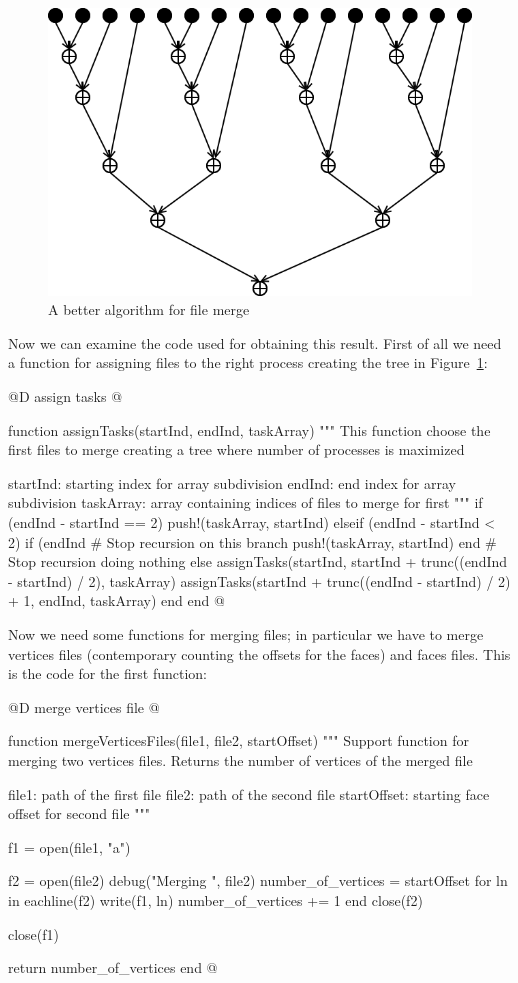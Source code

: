 \documentclass[11pt,oneside]{article}	%
\begin{document}
\begin{figure}[htb] %
   \centering
   \includegraphics[width=0.40\linewidth]{images/ParallelAlgorithm.png}
   \caption{A better algorithm for file merge}
   \label{fig:ParallelAlgorithm}
\end{figure}

Now we can examine the code used for obtaining this result. First of all we need a function for assigning files to the right process creating the tree in Figure~\ref{fig:ParallelAlgorithm}:

@D assign tasks
@{function assignTasks(startInd, endInd, taskArray)
  """
  This function choose the first files to merge
  creating a tree where number of processes is maximized

  startInd: starting index for array subdivision
  endInd: end index for array subdivision
  taskArray: array containing indices of files to merge for first
  """
  if (endInd - startInd == 2)
    push!(taskArray, startInd)
  elseif (endInd - startInd < 2)
    if (endInd %
      # Stop recursion on this branch
      push!(taskArray, startInd)
    end
    # Stop recursion doing nothing
  else
    assignTasks(startInd, startInd + trunc((endInd - startInd) / 2), taskArray)
    assignTasks(startInd + trunc((endInd - startInd) / 2) + 1, endInd, taskArray)
  end
end @}

Now we need some functions for merging files; in particular we have to merge vertices files (contemporary counting the offsets for the faces) and faces files. This is the code for the first function:

@D merge vertices file
@{function mergeVerticesFiles(file1, file2, startOffset)
  """
  Support function for merging two vertices files.
  Returns the number of vertices of the merged file

  file1: path of the first file
  file2: path of the second file
  startOffset: starting face offset for second file
  """

  f1 = open(file1, "a")

  f2 = open(file2)
  debug("Merging ", file2)
  number_of_vertices = startOffset
  for ln in eachline(f2)
    write(f1, ln)
    number_of_vertices += 1
  end
  close(f2)

  close(f1)

  return number_of_vertices
end @}
\end{document}
